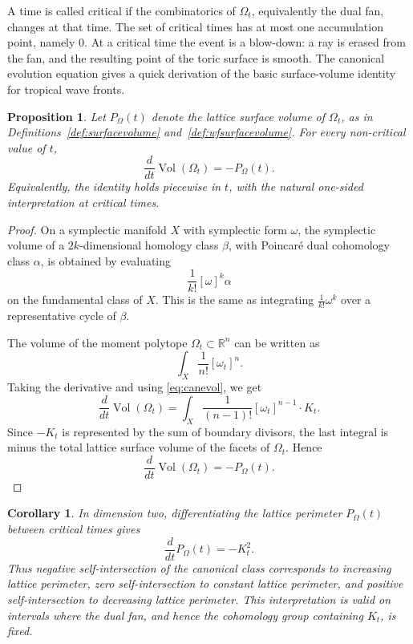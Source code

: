 \documentclass[a4paper,american,11pt]{amsart}
\theoremstyle{plain}
\newtheorem{proposition}[theorem]{Proposition}
\newtheorem{corollary}[theorem]{Corollary}
\theoremstyle{definition}
\newcommand{\R}{\mathbb R}
\begin{document}
A time is called critical if the combinatorics of \(\Omega_t\), equivalently
the dual fan, changes at that time.  The set of critical times has at most one
accumulation point, namely \(0\).  At a critical time the event is a
blow-down: a ray is erased from the fan, and the resulting point of the toric
surface is smooth.  The canonical evolution equation gives a quick derivation
of the basic surface-volume identity for tropical wave fronts.

\begin{proposition}\label{prop:twf_surfacevol}
Let \(P_\Omega(t)\) denote the lattice surface volume of \(\Omega_t\), as in
Definitions~\ref{def:surfacevolume} and~\ref{def:wfsurfacevolume}.  For every
non-critical value of \(t\),
\[
\frac{d}{dt}\operatorname{Vol}(\Omega_t)=-P_\Omega(t).
\]
Equivalently, the identity holds piecewise in \(t\), with the natural
one-sided interpretation at critical times.
\end{proposition}

\begin{proof}\label{proof:prop:twf_surfacevol}
On a symplectic manifold \(X\) with symplectic form \(\omega\), the
symplectic volume of a \(2k\)-dimensional homology class \(\beta\), with
Poincar\'e dual cohomology class \(\alpha\), is obtained by evaluating
\[
\frac{1}{k!}[\omega]^k\alpha
\]
on the fundamental class of \(X\).  This is the same as integrating
\(\frac{1}{k!}\omega^k\) over a representative cycle of \(\beta\).

The volume of the moment polytope \(\Omega_t\subset\R^n\) can be written as
\[
\int_X \frac{1}{n!}[\omega_t]^n.
\]
Taking the derivative and using \eqref{eq:canevol}, we get
\[
\frac{d}{dt}\operatorname{Vol}(\Omega_t)
=
\int_X \frac{1}{(n-1)!}[\omega_t]^{n-1}\cdot K_t.
\]
Since \(-K_t\) is represented by the sum of boundary divisors, the last
integral is minus the total lattice surface volume of the facets of
\(\Omega_t\).  Hence
\[
\frac{d}{dt}\operatorname{Vol}(\Omega_t)=-P_\Omega(t).
\]
\end{proof}

\begin{corollary}
In dimension two, differentiating the lattice perimeter \(P_\Omega(t)\)
between critical times gives
\[
\frac{d}{dt}P_\Omega(t)=-K_t^2.
\]
Thus negative self-intersection of the canonical class corresponds to
increasing lattice perimeter, zero self-intersection to constant lattice
perimeter, and positive self-intersection to decreasing lattice perimeter.
This interpretation is valid on intervals where the dual fan, and hence the
cohomology group containing \(K_t\), is fixed.
\end{corollary}
\end{document}
